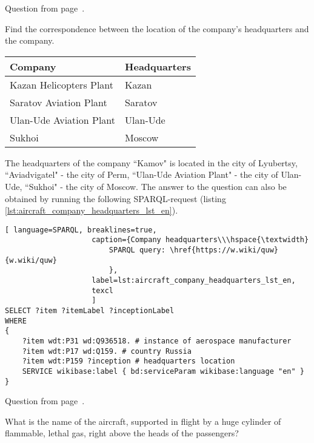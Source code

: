 Question from page~\pageref{question:aircraft_question_2}.


\begin{exercise}%
    \label{answer:aircraft_company_headquarters_en}
Find the correspondence between the location of the company's headquarters and the company.
\\
\begin{tabular}{ l | l }
Company & Headquarters \\ \hline
Kazan Helicopters Plant & Kazan \\
Saratov Aviation Plant & Saratov \\
Ulan-Ude Aviation Plant & Ulan-Ude \\
Sukhoi & Moscow \\
\end{tabular}
\end{exercise}

The headquarters of the company ``Kamov" is located in the city of Lyubertsy, ``Aviadvigatel" - the city of Perm, ``Ulan-Ude Aviation Plant" - the city of Ulan-Ude, ``Sukhoi" - the city of Moscow. The answer to the question can also be obtained by running the following SPARQL-request (listing \ref{lst:aircraft_company_headquarters_lst_en}). 
          
\begin{lstlisting}[ language=SPARQL, breaklines=true, 
                    caption={Company headquarters\\\hspace{\textwidth}
                        SPARQL query: \href{https://w.wiki/quw}{w.wiki/quw}
                        },
                    label=lst:aircraft_company_headquarters_lst_en,
                    texcl 
                    ]
SELECT ?item ?itemLabel ?inceptionLabel
WHERE
{
    ?item wdt:P31 wd:Q936518. # instance of aerospace manufacturer
  	?item wdt:P17 wd:Q159. # country Russia
  	?item wdt:P159 ?inception # headquarters location
    SERVICE wikibase:label { bd:serviceParam wikibase:language "en" }
}
\end{lstlisting}

Question from page~\pageref{question:aircraft_question_3}.


\begin{exercise}%
    \label{answer:aircraft_question_airship_en}
What is the name of the aircraft, supported in flight by a huge cylinder of flammable, lethal gas, right above the heads of the passengers?
\end{exercise}

